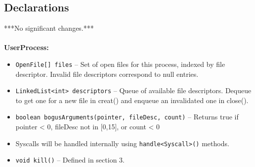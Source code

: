 \documentclass{article}
\begin{document}
\subsection{Declarations}
\large
***No significant changes.***\\\\
\normalsize
\textbf{UserProcess:}
\begin{itemize}
\item \texttt{OpenFile[] files} -- Set of open files for this process, indexed by file descriptor. Invalid file descriptors correspond to null entries.
\item \texttt{LinkedList<int> descriptors} -- Queue of available file descriptors. Dequeue to get one for a new file in creat() and enqueue an invalidated one in close().
\item \texttt{boolean bogusArguments(pointer, fileDesc, count)} -- Returns true if pointer < 0, fileDesc not in [0,15], or count < 0
\item Syscalls will be handled internally using \texttt{handle<Syscall>()} methods.
\item \texttt{void kill()} -- Defined in section 3.
\end{itemize}
\end{document}
